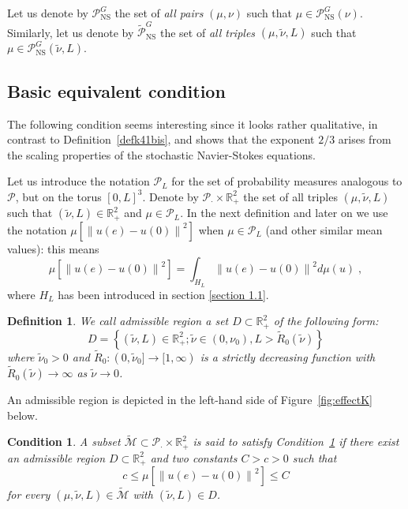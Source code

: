 \documentclass[11pt]{preprint}
\newtheorem{condition}{Condition}
\newtheorem{definition}[theorem]{Definition}
\begin{document}
Let us denote by $\mathcal{P}_{{\mathrm{NS}}}^{G}$ the set of \textit{all
pairs} $(\mu,\nu)$ such that $\mu\in\mathcal{P}_{{\mathrm{NS}}}^{G}\left(
\nu\right)  $. Similarly, let us denote by $\tilde{\mathcal{P}}_{{\mathrm{NS}%
}}^{G}$ the set of \textit{all triples} $(\mu,\tilde{\nu},L)$ such that
$\mu\in\mathcal{P}_{{\mathrm{NS}}}^{G}\left(  \tilde{\nu},L\right)  $.

\subsection{Basic equivalent condition}

The following condition seems interesting since it looks rather qualitative,
in contrast to Definition~\ref{defk41bis}, and shows that the exponent $2/3$
arises from the scaling properties of the stochastic Navier-Stokes equations.

Let us introduce the notation $\mathcal{P}_{L}$ for the set of probability
measures analogous to $\mathcal{P}$, but on the torus $\left[  0,L\right]
^{3} $. Denote by $\mathcal{P}_{\cdot}\times\mathbb{R}_{+}^{2}$ the set of all
triples $\left(  \mu,\tilde{\nu},L\right)  $ such that $\left(  \tilde{\nu
},L\right)  \in\mathbb{R}_{+}^{2}$ and $\mu\in\mathcal{P}_{L}$. In the next
definition and later on we use the notation $\mu\left[  \left\|  u\left(
e\right)  -u(0)\right\|  ^{2}\right]  $ when $\mu\in\mathcal{P}_{L}$ (and
other similar mean values): this means
\[
\mu\left[  \left\|  u\left(  e\right)  -u(0)\right\|  ^{2}\right]
=\int_{H_{L}}\left\|  u\left(  e\right)  -u(0)\right\|  ^{2}d\mu\left(
u\right)\;,
\]
where $H_{L}$ has been introduced in section \ref{section 1.1}.

\begin{definition}
We call admissible region a set $D\subset\mathbb{R}_{+}^{2}$ of the following
form:
\[
D=\left\{  \left(  \tilde{\nu},L\right)  \in\mathbb{R}_{+}^{2};\tilde{\nu}%
\in\left(  0,\nu_{0}\right)  ,L>\tilde{R}_{0}\left(  \tilde{\nu}\right)
\right\}
\]
where $\tilde{\nu}_{0}>0$ and $\tilde{R}_{0}\colon(0,\tilde{\nu}%
_{0}]\rightarrow\lbrack1,\infty)$ is a strictly decreasing function with
$\tilde{R}_{0}(\tilde{\nu})\rightarrow\infty$ as $\tilde{\nu}\rightarrow0$. 
\end{definition}

An
admissible region is depicted in the left-hand side of Figure~\ref{fig:effectK} below.

\begin{condition}
\label{condA} A subset $\tilde{\mathcal{M}}\subset\mathcal{P}_{\cdot}%
\times\mathbb{R}_{+}^{2}$ is said to satisfy Condition~\ref{condA} if there
exist an admissible region $D\subset\mathbb{R}_{+}^{2}$ and two constants
$C>c>0$ such that
\begin{equation}
c\leq\mu\left[  \left\|  u\left(  e\right)  -u(0)\right\|  ^{2}\right]  \leq
C\label{e:condA}%
\end{equation}
for every $(\mu,\tilde{\nu},L)\in\tilde{\mathcal{M}}$ with $\left(  \tilde
{\nu},L\right)  \in D$.
\end{condition}
\end{document}
